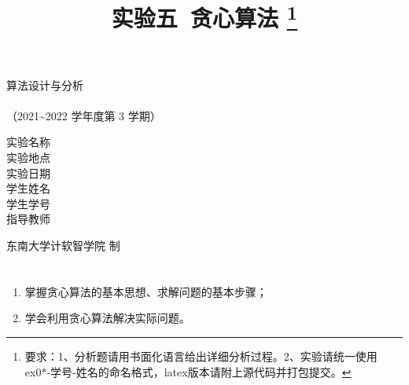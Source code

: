 \documentclass[12pt,a4paper]{ctexart}
\begin{document}
    \begin{titlepage}
        \heiti
        \vspace*{64pt}
        \begin{center}
            \fontsize{48pt}{0} 算法设计与分析\\
            \vspace*{36pt}
            \\
            \vspace*{48pt}
            \LARGE（2021\~{}2022 学年度\qquad 第 3 学期）\\
            \vspace*{48pt}
        
            \LARGE 实验名称\ \ \underline{\makebox[200pt]{\ExamTitle}}\\
            \LARGE 实验地点\ \ \underline{\makebox[200pt]{\ExamAddr}}\\
            \LARGE 实验日期\ \ \underline{\makebox[200pt]{\today}}\\
            \LARGE 学生姓名\ \ \underline{\makebox[200pt]{\MyName}}\\
            \LARGE 学生学号\ \ \underline{\makebox[200pt]{\MySID}}\\
            \LARGE 指导教师\ \ \underline{\makebox[200pt]{\TeacherName}}\\
            \vspace*{48pt}
            
            \LARGE 东南大学\quad  计软智学院 \quad 制
        \end{center}
    \end{titlepage}

\title{
  {\heiti \textbf{实验五\ 贪心算法}
    \footnote{要求：1、分析题请用书面化语言给出详细分析过程。2、实验请统一使用ex0*-学号-姓名的命名格式，latex版本请附上源代码并打包提交。}
    }
}
\date{}

\maketitle

\section*{\bf \color{black}{一、实验目的及意义}}
\noindent
\begin{enumerate}
	\item[(1)]  掌握贪心算法的基本思想、求解问题的基本步骤；
	\item[(2)]  学会利用贪心算法解决实际问题。
\end{enumerate}
\end{document}
